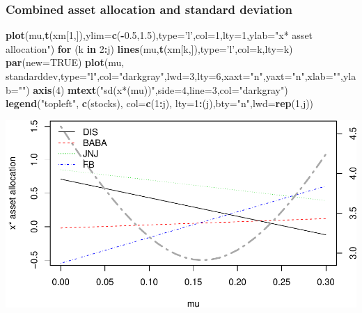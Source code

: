\documentclass[]{article}
\newenvironment{Shaded}{\begin{snugshade}}{\end{snugshade}}
\newcommand{\KeywordTok}[1]{\textcolor[rgb]{0.13,0.29,0.53}{\textbf{#1}}}
\newcommand{\DataTypeTok}[1]{\textcolor[rgb]{0.13,0.29,0.53}{#1}}
\newcommand{\DecValTok}[1]{\textcolor[rgb]{0.00,0.00,0.81}{#1}}
\newcommand{\FloatTok}[1]{\textcolor[rgb]{0.00,0.00,0.81}{#1}}
\newcommand{\StringTok}[1]{\textcolor[rgb]{0.31,0.60,0.02}{#1}}
\newcommand{\OtherTok}[1]{\textcolor[rgb]{0.56,0.35,0.01}{#1}}
\newcommand{\ControlFlowTok}[1]{\textcolor[rgb]{0.13,0.29,0.53}{\textbf{#1}}}
\newcommand{\OperatorTok}[1]{\textcolor[rgb]{0.81,0.36,0.00}{\textbf{#1}}}
\newcommand{\NormalTok}[1]{#1}
\begin{document}
\subsubsection{Combined asset allocation and standard
deviation}\label{combined-asset-allocation-and-standard-deviation}

\begin{Shaded}
\begin{Highlighting}[]
\KeywordTok{plot}\NormalTok{(mu,}\KeywordTok{t}\NormalTok{(xm[}\DecValTok{1}\NormalTok{,]),}\DataTypeTok{ylim=}\KeywordTok{c}\NormalTok{(}\OperatorTok{-}\FloatTok{0.5}\NormalTok{,}\FloatTok{1.5}\NormalTok{),}\DataTypeTok{type=}\StringTok{'l'}\NormalTok{,}\DataTypeTok{col=}\DecValTok{1}\NormalTok{,}\DataTypeTok{lty=}\DecValTok{1}\NormalTok{,}\DataTypeTok{ylab=}\StringTok{"x* asset allocation"}\NormalTok{)}
\ControlFlowTok{for}\NormalTok{ (k }\ControlFlowTok{in} \DecValTok{2}\OperatorTok{:}\NormalTok{j) }\KeywordTok{lines}\NormalTok{(mu,}\KeywordTok{t}\NormalTok{(xm[k,]),}\DataTypeTok{type=}\StringTok{'l'}\NormalTok{,}\DataTypeTok{col=}\NormalTok{k,}\DataTypeTok{lty=}\NormalTok{k)}
\KeywordTok{par}\NormalTok{(}\DataTypeTok{new=}\OtherTok{TRUE}\NormalTok{)}
\KeywordTok{plot}\NormalTok{(mu, standarddev,}\DataTypeTok{type=}\StringTok{"l"}\NormalTok{,}\DataTypeTok{col=}\StringTok{"darkgray"}\NormalTok{,}\DataTypeTok{lwd=}\DecValTok{3}\NormalTok{,}\DataTypeTok{lty=}\DecValTok{6}\NormalTok{,}\DataTypeTok{xaxt=}\StringTok{"n"}\NormalTok{,}\DataTypeTok{yaxt=}\StringTok{"n"}\NormalTok{,}\DataTypeTok{xlab=}\StringTok{""}\NormalTok{,}\DataTypeTok{ylab=}\StringTok{""}\NormalTok{)}
\KeywordTok{axis}\NormalTok{(}\DecValTok{4}\NormalTok{)}
\KeywordTok{mtext}\NormalTok{(}\StringTok{"sd(x*(mu))"}\NormalTok{,}\DataTypeTok{side=}\DecValTok{4}\NormalTok{,}\DataTypeTok{line=}\DecValTok{3}\NormalTok{,}\DataTypeTok{col=}\StringTok{"darkgray"}\NormalTok{)}
\KeywordTok{legend}\NormalTok{(}\StringTok{"topleft"}\NormalTok{, }\KeywordTok{c}\NormalTok{(stocks), }\DataTypeTok{col=}\KeywordTok{c}\NormalTok{(}\DecValTok{1}\OperatorTok{:}\NormalTok{j), }\DataTypeTok{lty=}\DecValTok{1}\OperatorTok{:}\NormalTok{(j),}\DataTypeTok{bty=}\StringTok{"n"}\NormalTok{,}\DataTypeTok{lwd=}\KeywordTok{rep}\NormalTok{(}\DecValTok{1}\NormalTok{,j))}
\end{Highlighting}
\end{Shaded}

\includegraphics{Markowitz_Research_Me_files/figure-latex/unnamed-chunk-19-1.pdf}
\end{document}
